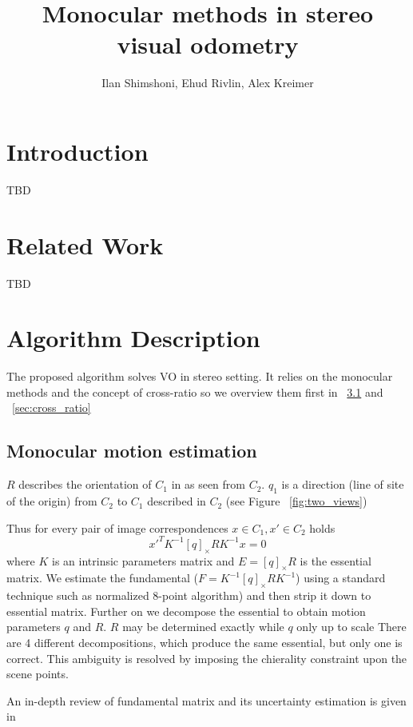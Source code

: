 \documentclass[10pt]{article}         %
\title{Monocular methods in stereo visual odometry}
\author{Ilan Shimshoni, Ehud Rivlin, Alex Kreimer}
\begin{document}
\maketitle


\section{Introduction}
TBD

\section{Related Work}
TBD

\section{Algorithm Description}

The proposed algorithm solves VO in stereo setting. It relies on the
monocular methods and the concept of cross-ratio so we overview them
first in ~\ref{sec:mono_odo} and ~\ref{sec:cross_ratio}

\subsection{Monocular motion estimation}\label{sec:mono_odo}
$R$ describes the orientation of $C_1$ in as seen from $C_2$. $q_1$ is
a direction (line of site of the origin) from $C_2$ to $C_1$ described
in $C_2$ (see Figure ~\ref{fig:two_views})

Thus for every pair of image correspondences $x\in C_1,x'\in C_2$ holds
\[
x'^TK^{-1}[q]_{\times}RK^{-1}x=0
\]
where $K$ is an intrinsic parameters matrix and $E=[q]_{\times}R$ is
the essential matrix.  We estimate the fundamental
($F=K^{-1}[q]_{\times}RK^{-1}$) using a standard technique such as
normalized 8-point algorithm) and then strip it down to essential
matrix.  Further on we decompose the essential to obtain motion
parameters $q$ and $R$.  $R$ may be determined exactly while $q$ only
up to scale There are 4 different decompositions, which produce the
same essential, but only one is correct.  This ambiguity is resolved
by imposing the chierality constraint upon the scene points.

An in-depth review of fundamental matrix and its uncertainty
estimation is given in ~\cite{zhang1998determining}
\end{document}
